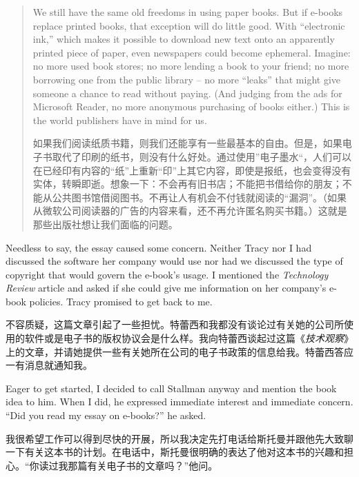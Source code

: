 \begin{quote}
\ifdefined\eng
We still have the same old freedoms in using paper books. But if e-books replace printed books, that exception will do little good. With ``electronic ink,'' which makes it possible to download new text onto an apparently printed piece of paper, even newspapers could become ephemeral. Imagine: no more used book stores; no more lending a book to your friend; no more borrowing one from the public library -- no more ``leaks'' that might give someone a chance to read without paying. (And judging from the ads for Microsoft Reader, no more anonymous purchasing of books either.) This is the world publishers have in mind for us.
\fi

\ifdefined\chs
如果我们阅读纸质书籍，则我们还能享有一些最基本的自由。但是，如果电子书取代了印刷的纸书，则没有什么好处。通过使用”电子墨水“，人们可以在已经印有内容的“纸”上重新“印”上其它内容，即使是报纸，也会变得没有实体，转瞬即逝。想象一下：不会再有旧书店；不能把书借给你的朋友；不能从公共图书馆借阅图书。不再让人有机会不付钱就阅读的“漏洞”。（如果从微软公司阅读器的广告的内容来看，还不再允许匿名购买书籍。）这就是那些出版社想让我们面临的问题。
\fi
\end{quote}

\ifdefined\eng
Needless to say, the essay caused some concern. Neither Tracy nor I had discussed the software her company would use nor had we discussed the type of copyright that would govern the e-book's usage. I mentioned the \textit{Technology Review} article and asked if she could give me information on her company's e-book policies. Tracy promised to get back to me.
\fi

\ifdefined\chs
不容质疑，这篇文章引起了一些担忧。特蕾西和我都没有谈论过有关她的公司所使用的软件或是电子书的版权协议会是什么样。我向特蕾西谈起过这篇《\textit{技术观察}》上的文章，并请她提供一些有关她所在公司的电子书政策的信息给我。特蕾西答应一有消息就通知我。
\fi

\ifdefined\eng
Eager to get started, I decided to call Stallman anyway and mention the book idea to him. When I did, he expressed immediate interest and immediate concern. ``Did you read my essay on e-books?'' he asked.
\fi

\ifdefined\chs
我很希望工作可以得到尽快的开展，所以我决定先打电话给斯托曼并跟他先大致聊一下有关这本书的计划。在电话中，斯托曼很明确的表达了他对这本书的兴趣和担心。“你读过我那篇有关电子书的文章吗？”他问。
\fi

